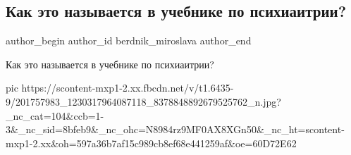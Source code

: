  
 
 
 
 
 
\subsection{Как это называется в учебнике по психиаитрии?}
\label{sec:21_06_2021.fb.berdnik_miroslava.1.psihiatria}
\ifcmt
 author_begin
   author_id berdnik_miroslava
 author_end
\fi

Как это называется в учебнике по психиаитрии?

\ifcmt
  pic https://scontent-mxp1-2.xx.fbcdn.net/v/t1.6435-9/201757983_1230317964087118_8378848892679525762_n.jpg?_nc_cat=104&ccb=1-3&_nc_sid=8bfeb9&_nc_ohc=N8984rz9MF0AX8XGn50&_nc_ht=scontent-mxp1-2.xx&oh=597a36b7af15c989cb8ef68e441259af&oe=60D72E62
\fi
